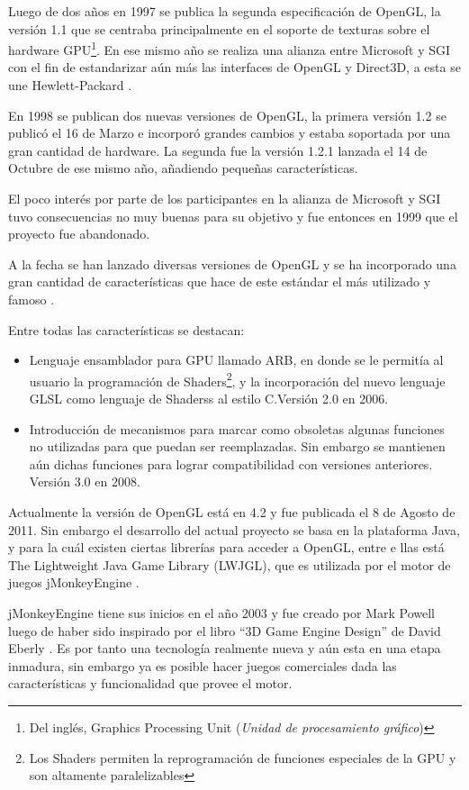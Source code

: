 \documentclass[a4paper,12pt,openany,oneside]{book}
\begin{document}
Luego de dos años en 1997 se publica la segunda especificación de OpenGL, la versión 1.1 que se centraba principalmente en el soporte de texturas sobre el hardware GPU\footnote{Del inglés, Graphics Processing Unit (\textit{Unidad de procesamiento gráfico})}. En ese mismo año se realiza una alianza entre Microsoft y SGI con el fin de estandarizar aún más las interfaces de OpenGL y Direct3D, a esta se une Hewlett-Packard \cite{WIKI}.

En 1998 se publican dos nuevas versiones de OpenGL, la primera versión 1.2 se publicó el 16 de Marzo e incorporó grandes cambios y estaba soportada por una gran cantidad de hardware. La segunda fue la versión 1.2.1 lanzada el 14 de Octubre de ese mismo año, añadiendo pequeñas características. 

El poco interés por parte de los participantes en la alianza de Microsoft y SGI tuvo consecuencias no muy buenas para su objetivo y fue entonces en 1999 que el proyecto fue abandonado.

A la fecha se han lanzado diversas versiones de OpenGL y se ha incorporado una gran cantidad de características que hace de este estándar el más utilizado y famoso \cite{WIKI}. 

Entre todas las características se destacan:
\begin{itemize}
\item Lenguaje ensamblador para GPU llamado ARB, en donde se le permitía al usuario la programación de Shaders\footnote{Los Shaders permiten la reprogramación de funciones especiales de la GPU y son altamente paralelizables}, y la incorporación del nuevo lenguaje GLSL como lenguaje de Shaderss al estilo C.Versión 2.0 en 2006. 
\item Introducción de mecanismos para marcar como obsoletas algunas funciones no utilizadas para que puedan ser reemplazadas. Sin embargo se mantienen aún dichas funciones para lograr compatibilidad con versiones anteriores. Versión 3.0 en 2008.
\end{itemize}
Actualmente la versión de OpenGL está en 4.2 y fue publicada el 8 de Agosto de 2011. Sin embargo el desarrollo del actual proyecto se basa en la plataforma Java, y para la cuál existen ciertas librerías para acceder a OpenGL, entre e llas está The Lightweight Java Game Library (LWJGL), que es utilizada por el motor de juegos jMonkeyEngine \cite{WIKI}.

jMonkeyEngine tiene sus inicios en el año 2003 y fue creado por Mark Powell luego de haber sido inspirado por el libro “3D Game Engine Design” de David Eberly \cite{EBERLY}. Es por tanto una tecnología realmente nueva y aún esta en una etapa inmadura, sin embargo ya es posible hacer juegos comerciales dada las características y funcionalidad que provee el motor.
\end{document}

